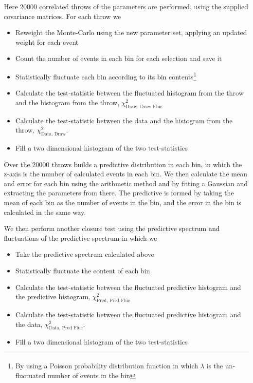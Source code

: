 Here 20000 correlated throws of the parameters are performed, using the supplied covariance matrices. For each throw we
\begin{itemize}
	\item Reweight the Monte-Carlo using the new parameter set, applying an updated weight for each event
	\item Count the number of events in each \pmu \cosmu bin for each selection and save it
	\item Statistically fluctuate each bin according to its bin contents\footnote{By using a Poisson probability distribution function in which $\lambda$ is the un-fluctuated number of events in the bin}
	\item Calculate the test-statistic between the fluctuated histogram from the throw and the histogram from the throw, $\chi^2_{\text{Draw, Draw Fluc}}$
	\item Calculate the test-statistic between the data and the histogram from the throw, $\chi^2_{\text{Data, Draw}}$.
	\item Fill a two dimensional histogram of the two test-statistics
\end{itemize}
Over the 20000 throws builds a predictive distribution in each \pmu \cosmu bin, in which the z-axis is the number of calculated events in each bin. We then calculate the mean and error for each bin using the arithmetic method and by fitting a Gaussian and extracting the parameters from there. The predictive is formed by taking the mean of each bin as the number of events in the bin, and the error in the bin is calculated in the same way.

We then perform another closure test using the predictive spectrum and fluctuations of the predictive spectrum in which we
\begin{itemize}
	\item Take the predictive spectrum calculated above
	\item Statistically fluctuate the content of each \pmu \cosmu bin 
	\item Calculate the test-statistic between the fluctuated predictive histogram and the predictive histogram, $\chi^2_{\text{Pred, Pred Fluc}}$
	\item Calculate the test-statistic between the fluctuated predictive histogram and the data, $\chi^2_{\text{Data, Pred Fluc}}$.
	\item Fill a two dimensional histogram of the two test-statistics
\end{itemize}

